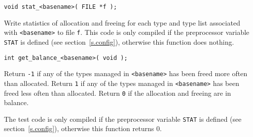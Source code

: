 \begin{verbatim}
void stat_<basename>( FILE *f );
\end{verbatim}
\begin{desc}
\begin{sloppypar}
Write statistics of allocation and freeing for each type and type
list associated with {\tt <basename>} to file {\tt f}.
This code is only compiled if the preprocessor variable {\tt STAT} is
defined (see section~\ref{s.config}),
otherwise this function does nothing.
\end{sloppypar}
\end{desc}
\begin{verbatim}
int get_balance_<basename>( void );
\end{verbatim}
\begin{desc}
\begin{sloppypar}
Return \verb+-1+ if any of the types managed in \verb"<basename>" has
been freed more often than allocated.
Return \verb+1+ if any of the types managed in \verb"<basename>" has
been freed less often than allocated.
Return \verb+0+ if the allocation and freeing are in balance.
\par
The test code is only compiled if the preprocessor variable {\tt STAT} is
defined (see section~\ref{s.config}),
otherwise this function returns 0.
\end{sloppypar}
\end{desc}
